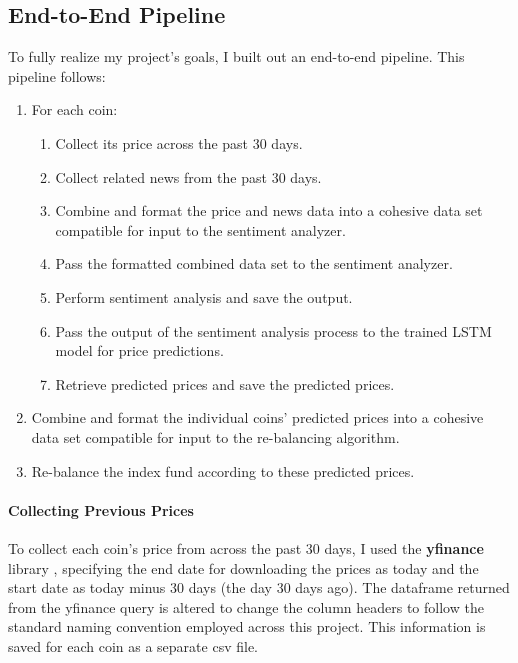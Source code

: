 \documentclass[10pt,twocolumn]{article}
\begin{document}
\subsection{End-to-End Pipeline}

To fully realize my project's goals, I built out an end-to-end pipeline. This pipeline follows:

\begin{enumerate}
    \item For each coin:

    \begin{enumerate}
        \item Collect its price across the past 30 days.
        \item Collect related news from the past 30 days.
        \item Combine and format the price and news data into a cohesive data set compatible for input to the sentiment analyzer.
        \item Pass the formatted combined data set to the sentiment analyzer.
        \item Perform sentiment analysis and save the output.
        \item Pass the output of the sentiment analysis process to the trained LSTM model for price predictions.
        \item Retrieve predicted prices and save the predicted prices.
    \end{enumerate}

    \item Combine and format the individual coins' predicted prices into a cohesive data set compatible for input to the re-balancing algorithm.
    \item Re-balance the index fund according to these predicted prices.
\end{enumerate}

\paragraph{Collecting Previous Prices}

To collect each coin's price from across the past 30 days, I used the \textbf{yfinance} library \cite{yfinance}, specifying the end date for downloading the prices as today and the start date as today minus 30 days (the day 30 days ago). The dataframe returned from the yfinance query is altered to change the column headers to follow the standard naming convention employed across this project. This information is saved for each coin as a separate csv file.
\end{document}
